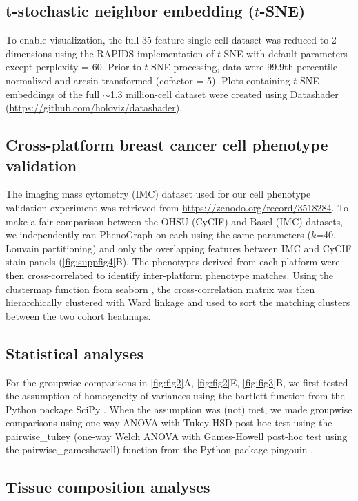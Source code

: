 \documentclass[preprint,review,3p,12pt]{elsarticle}
\begin{document}
\subsection{t-stochastic neighbor embedding ($t$-SNE)}
To enable visualization, the full 35-feature single-cell dataset was reduced to 2 dimensions using the RAPIDS implementation of $t$-SNE \cite{tsne2008} with default parameters except perplexity = 60. Prior to $t$-SNE processing, data were 99.9th-percentile normalized and arcsin transformed (cofactor = 5). Plots containing $t$-SNE embeddings of the full $\sim$1.3 million-cell dataset were created using Datashader (\url{https://github.com/holoviz/datashader}).

\subsection{Cross-platform breast cancer cell phenotype validation}
The imaging mass cytometry (IMC) dataset \cite{jackson_single-cell_2020} used for our cell phenotype validation experiment was retrieved from \url{https://zenodo.org/record/3518284}. To make a fair comparison between the OHSU (CyCIF) and Basel (IMC) datasets, we independently ran PhenoGraph on each using the same parameters ($k$=40, Louvain partitioning) and only the overlapping features between IMC and CyCIF stain panels (\autoref{fig:suppfig4}B). The phenotypes derived from each platform were then cross-correlated to identify inter-platform phenotype matches. Using the clustermap function from seaborn \cite{seaborn2020}, the cross-correlation matrix was then hierarchically clustered with Ward linkage and used to sort the matching clusters between the two cohort heatmaps.

\subsection{Statistical analyses}
For the groupwise comparisons in \autoref{fig:fig2}A, \autoref{fig:fig2}E, \autoref{fig:fig3}B, we first tested the assumption of homogeneity of variances using the bartlett function from the Python package SciPy \cite{scipy2020}. When the assumption was (not) met, we made groupwise comparisons using one-way ANOVA with Tukey-HSD post-hoc test using the pairwise\_tukey (one-way Welch ANOVA with Games-Howell post-hoc test using the pairwise\_gameshowell) function from the Python package pingouin \cite{pingouin2018}.

\subsection{Tissue composition analyses}
\end{document}

